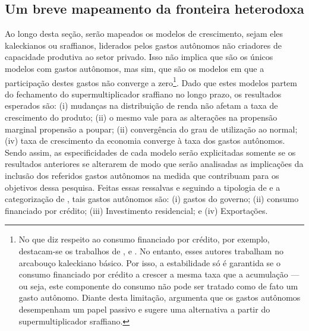 \subsection{Um breve mapeamento da fronteira heterodoxa}
\label{Hibridos}


Ao longo desta seção, serão mapeados os modelos de crescimento, 
sejam eles kaleckianos ou sraffianos, liderados pelos gastos autônomos não criadores de capacidade produtiva ao setor privado. Isso não implica que são os únicos modelos com gastos autônomos, mas sim, que são os modelos em que a participação destes gastos não converge a zero\footnote{
	No que diz respeito ao consumo financiado por crédito, por exemplo, destacam-se os trabalhos de \textcite{dutt_maturity_2006}, \textcite{palley_inside_2010} e \textcite{hein_finance-dominated_2012}.
	No entanto, esses autores trabalham no arcabouço kaleckiano básico. Por isso, a estabilidade só é garantida se o consumo financiado por crédito a crescer a mesma taxa que a acumulação --- ou seja, este componente do consumo não pode ser tratado como de fato um gasto autônomo.
	Diante desta limitação, \textcite{pariboni_household_2016} argumenta que os gastos autônomos desempenham um papel passivo e sugere uma alternativa a partir do supermultiplicador sraffiano. 
}.
Dado que estes modelos partem do fechamento do supermultiplicador sraffiano no longo prazo, os resultados esperados são: (i) mudanças na distribuição de renda não afetam a taxa de crescimento do produto; (ii) o mesmo vale para as alterações na propensão marginal propensão a poupar; (ii) convergência do grau de utilização ao normal; (iv) taxa de crescimento da economia converge à taxa dos gastos autônomos.
Sendo assim, as especificidades de cada modelo serão explicitadas somente se os resultados anteriores se alterarem de modo que serão analisadas as implicações da inclusão dos referidos gastos autônomos na medida que contribuam para os objetivos dessa pesquisa.
Feitas essas ressalvas e seguindo a tipologia de \textcite{cesaratto_technical_2003} e a categorização de \textcite{serrano_sraffian_1995}, tais gastos autônomos são: (i) gastos do governo; (ii) consumo financiado por crédito; (iii) Investimento residencial; e (iv) Exportações.


